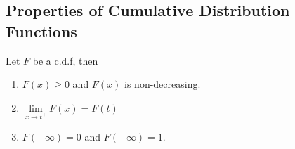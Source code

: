 \documentclass[openany]{report}
\begin{document}
\subsection{Properties of Cumulative Distribution Functions}
\begin{theorem}
    
    Let $F$ be a c.d.f, then
    \begin{enumerate}[label=(\roman*)]
        \item $F(x) \geq 0$ and $F(x)$ is non-decreasing.
        \item $\lim\limits_{x\rightarrow t^+}F(x) = F(t)$
        \item $F(-\infty) = 0$ and $F(-\infty)= 1$.
    \end{enumerate}
\end{theorem}
\end{document}
